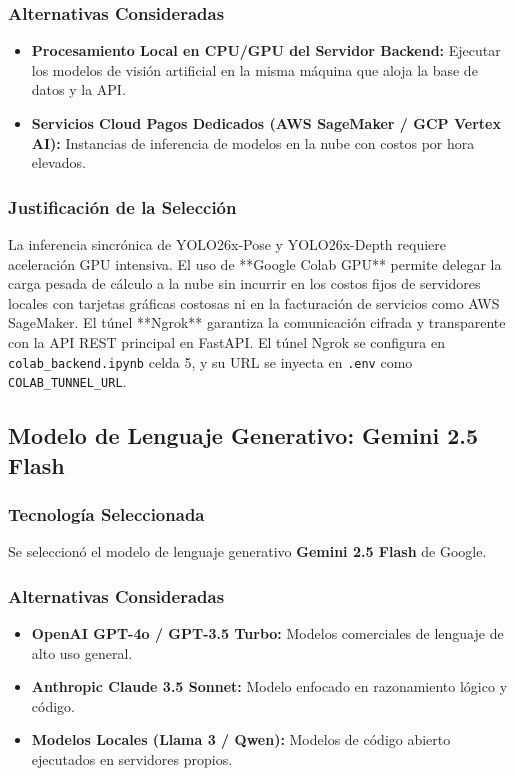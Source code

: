 \subsubsection{Alternativas Consideradas}
\begin{itemize}
    \item \textbf{Procesamiento Local en CPU/GPU del Servidor Backend:} Ejecutar los modelos de visión artificial en la misma máquina que aloja la base de datos y la API.
    \item \textbf{Servicios Cloud Pagos Dedicados (AWS SageMaker / GCP Vertex AI):} Instancias de inferencia de modelos en la nube con costos por hora elevados.
\end{itemize}

\subsubsection{Justificación de la Selección}
La inferencia sincrónica de YOLO26x-Pose y YOLO26x-Depth requiere aceleración GPU intensiva. El uso de **Google Colab GPU** permite delegar la carga pesada de cálculo a la nube sin incurrir en los costos fijos de servidores locales con tarjetas gráficas costosas ni en la facturación de servicios como AWS SageMaker. El túnel **Ngrok** garantiza la comunicación cifrada y transparente con la API REST principal en FastAPI. El túnel Ngrok se configura en \texttt{colab\_backend.ipynb} celda 5, y su URL se inyecta en \texttt{.env} como \texttt{COLAB\_TUNNEL\_URL}.

\subsection{Modelo de Lenguaje Generativo: Gemini 2.5 Flash}

\subsubsection{Tecnología Seleccionada}
Se seleccionó el modelo de lenguaje generativo \textbf{Gemini 2.5 Flash} de Google.

\subsubsection{Alternativas Consideradas}
\begin{itemize}
    \item \textbf{OpenAI GPT-4o / GPT-3.5 Turbo:} Modelos comerciales de lenguaje de alto uso general.
    \item \textbf{Anthropic Claude 3.5 Sonnet:} Modelo enfocado en razonamiento lógico y código.
    \item \textbf{Modelos Locales (Llama 3 / Qwen):} Modelos de código abierto ejecutados en servidores propios.
\end{itemize}

